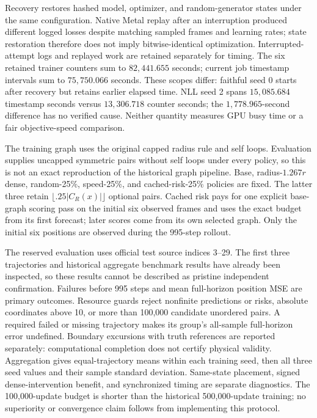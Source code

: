 Recovery restores hashed model, optimizer, and random-generator states under
the same configuration. Native Metal replay after an interruption produced
different logged losses despite matching sampled frames and learning rates;
state restoration therefore does not imply bitwise-identical optimization.
Interrupted-attempt logs and replayed work are retained separately for timing.
The six retained trainer counters sum to $82{,}441.655$ seconds; current
job timestamp intervals sum to $75{,}750.066$ seconds. These scopes differ:
faithful seed 0 starts after recovery but retains earlier elapsed time.
NLL seed 2 spans $15{,}085.684$ timestamp seconds versus $13{,}306.718$
counter seconds; the $1{,}778.965$-second difference has no verified cause.
Neither quantity measures GPU busy time or a fair objective-speed comparison.

The training graph uses the original capped radius rule and self loops.
Evaluation supplies uncapped symmetric pairs without self loops under every
policy, so this is not an exact reproduction of the historical graph pipeline.
Base, radius-$1.267r$ dense, random-25\%, speed-25\%, and cached-risk-25\%
policies are fixed. The latter three retain
$\lfloor.25|C_R(x)|\rfloor$ optional pairs. Cached risk pays for one explicit
base-graph scoring pass on the initial six observed frames and uses the exact
budget from its first forecast; later scores come from its own selected graph.
Only the initial six positions are observed during the 995-step rollout.

The reserved evaluation uses official test source indices 3--29. The first
three trajectories and historical aggregate benchmark results have already
been inspected, so these results cannot be described as pristine independent
confirmation. Failures before 995 steps and mean full-horizon position MSE
are primary outcomes. Resource guards reject nonfinite predictions or risks,
absolute coordinates above 10, or more than 100,000 candidate unordered pairs.
A required failed or missing trajectory makes its group's all-sample
full-horizon error undefined. Boundary excursions with truth references are
reported separately: computational completion does not certify physical
validity. Aggregation gives equal-trajectory means within each training seed,
then all three seed values and their sample standard deviation. Same-state
placement, signed dense-intervention benefit, and synchronized timing are
separate diagnostics. The 100,000-update budget is shorter than the historical
500,000-update training; no superiority or convergence claim follows from
implementing this protocol.


